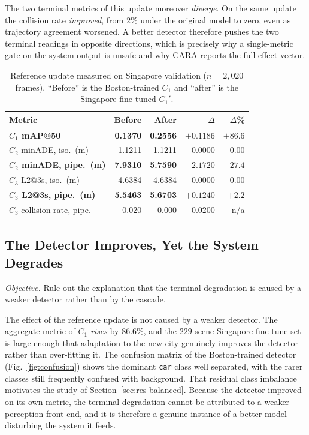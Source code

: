 \documentclass[conference]{IEEEtran}
\begin{document}
The two terminal metrics of this update moreover \emph{diverge}. On the same update
the collision rate \emph{improved}, from $2\%$ under the original model to zero, even
as trajectory agreement worsened. A better detector therefore pushes the two terminal
readings in opposite directions, which is precisely why a single-metric gate on the
system output is unsafe and why CARA reports the full effect vector.

\begin{table}[htbp]
\caption{Reference update measured on Singapore validation ($n=2{,}020$ frames).
``Before'' is the Boston-trained $C_1$ and ``after'' is the Singapore-fine-tuned
$C_1'$.}
\label{tab:results}
\centering
\renewcommand{\arraystretch}{1.2}
\setlength{\tabcolsep}{4pt}
\begin{tabular}{@{}lrrrr@{}}
\toprule
\textbf{Metric} & \textbf{Before} & \textbf{After} & \textbf{$\Delta$} & \textbf{$\Delta$\%} \\
\midrule
\textbf{$C_1$ mAP@50}       & \textbf{0.1370}  & \textbf{0.2556} & $\mathbf{+0.1186}$  & $\mathbf{+86.6}$ \\
$C_2$ minADE, iso.\ (m)      & 1.1211  & 1.1211 & $0.0000$   & $0.00$   \\
\textbf{$C_2$ minADE, pipe.\ (m)} & \textbf{7.9310} & \textbf{5.7590} & $\mathbf{-2.1720}$ & $\mathbf{-27.4}$ \\
$C_3$ L2@3s, iso.\ (m)       & 4.6384  & 4.6384 & $0.0000$   & $0.00$   \\
\textbf{$C_3$ L2@3s, pipe.\ (m)} & \textbf{5.5463} & \textbf{5.6703} & $\mathbf{+0.1240}$ & $\mathbf{+2.2}$ \\
$C_3$ collision rate, pipe. & 0.020   & 0.000  & $-0.0200$   & n/a \\
\bottomrule
\end{tabular}
\end{table}

\subsection{The Detector Improves, Yet the System Degrades}
\label{sec:res-decouple}
\emph{Objective.} Rule out the explanation that the terminal degradation is caused
by a weaker detector rather than by the cascade.

The effect of the reference update is not caused by a weaker detector. The aggregate
metric of $C_1$ \emph{rises} by $86.6\%$, and the $229$-scene Singapore fine-tune set
is large enough that adaptation to the new city genuinely improves the detector
rather than over-fitting it. The confusion matrix of the Boston-trained detector
(Fig.~\ref{fig:confusion}) shows the dominant \texttt{car} class well separated,
with the rarer classes still frequently confused with background. That residual
class imbalance motivates the study of Section~\ref{sec:res-balanced}. Because the
detector improved on its own metric, the terminal degradation cannot be attributed
to a weaker perception front-end, and it is therefore a genuine instance of a better
model disturbing the system it feeds.
\end{document}

